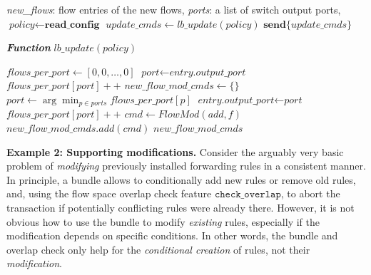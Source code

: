 \documentclass[conference]{sigcomm-alternate}
\newcommand{\checko}{\texttt{check\_overlap}\xspace}
\newcommand{\petr}[1]{\textit{\textcolor{blue}{[petr]: #1}}} %
\begin{document}
{\small
\begin{algorithm}[t]
    \caption{$\textit{Na\"ive Flow Balancing}$}
    \label{alg:naive-lb}
\begin{algorithmic}[1]

    \Require \emph{new\_flows}: flow entries of the new flows,
    \emph{ports}: a list of switch output ports, 
    \State $\textit{policy} \gets \textbf{read\_config}$
    \State $\textit{update\_cmds} \gets \textit{lb\_update}(policy)$ %
    \State $\textbf{send}\{\textit{update\_cmds}\}$
    \Statex

    \Statex \emph{\bf Function} $\textit{lb\_update}(\textit{policy})$ %

	\State $\textit{flows\_per\_port} \gets [0, 0, \ldots, 0]$
	    \State $\textit{port} \gets \textit{entry.output\_port}$
	    \State $\textit{flows\_per\_port}[\textit{port}]++$
	\EndFor
	\State $\textit{new\_flow\_mod\_cmds} \gets \{\}$
	    \State $\textit{port} \gets \arg\min_{p\in \textit{ports}} \textit{flows\_per\_port}[p]$
	    \State $\textit{entry.output\_port} \gets \textit{port}$
	    \State $\textit{flows\_per\_port}[\textit{port}]++$
	    \State $\textit{cmd} \gets \textit{FlowMod}(add,f)$
	    \State $\textit{new\_flow\_mod\_cmds}.\textit{add}(\textit{cmd})$
	\EndFor
	\Return $\textit{new\_flow\_mod\_cmds}$
\end{algorithmic}
\end{algorithm}
}


\vspace{1mm}
\noindent\textbf{Example 2: Supporting modifications.}
Consider the arguably very basic problem of \emph{modifying} previously installed forwarding rules
in a consistent manner.
In principle, a bundle allows to conditionally add new rules or remove
old rules, and, using the flow space overlap
check feature $\checko$, to abort the transaction if potentially conflicting
rules were already there. However, it is not obvious how  
to use the bundle to
modify \emph{existing} rules, especially if the modification depends on 
specific conditions.
In other words, the bundle and overlap check only help
for the \emph{conditional creation} of rules, not their \emph{modification}.
\end{document}

